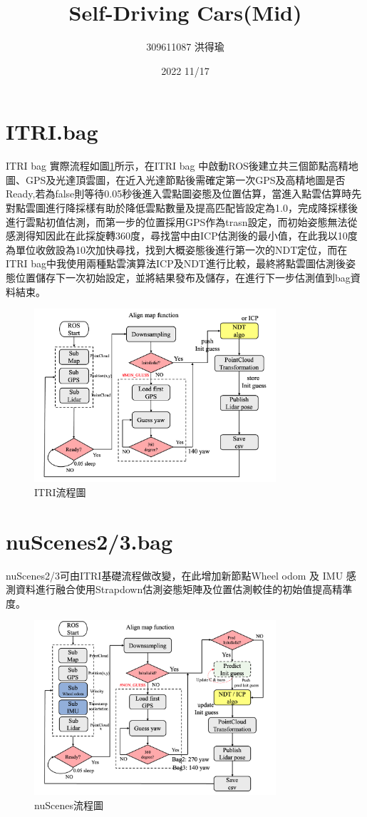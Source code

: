 \documentclass{article}
\title{Self-Driving Cars(Mid)}
\author{309611087 洪得瑜}
\date{2022 11/17}
\begin{document}
\maketitle
\section{ITRI.bag}
ITRI bag 實際流程如圖\ref{fig:itri.png}所示，在ITRI bag 中啟動ROS後建立共三個節點高精地圖、GPS及光達頂雲圖，在近入光達節點後需確定第一次GPS及高精地圖是否Ready,若為false則等待0.05秒後進入雲點圖姿態及位置估算，當進入點雲估算時先對點雲圖進行降採樣有助於降低雲點數量及提高匹配皆設定為1.0，完成降採樣後進行雲點初值估測，而第一步的位置採用GPS作為trasn設定，而初始姿態無法從感測得知因此在此採旋轉360度，尋找當中由ICP估測後的最小值，在此我以10度為單位收斂設為10次加快尋找，找到大概姿態後進行第一次的NDT定位，而在ITRI bag中我使用兩種點雲演算法ICP及NDT進行比較，最終將點雲圖估測後姿態位置儲存下一次初始設定，並將結果發布及儲存，在進行下一步估測值到bag資料結束。
\begin{figure}[H]
\centering
	\includegraphics[width=0.8\textwidth]{./ITRI_flow.png}
	\caption{ITRI流程圖}
	\label{fig:itri.png}
\end{figure}


\section{nuScenes2/3.bag}
nuScenes2/3可由ITRI基礎流程做改變，在此增加新節點Wheel odom 及 IMU 感測資料進行融合使用Strapdown估測姿態矩陣及位置估測較佳的初始值提高精準度。
\begin{figure}[H]
\centering
	\includegraphics[width=0.8\textwidth]{./nuscenes.png}
	\caption{nuScenes流程圖}
	\label{fig:.png}
\end{figure}
\end{document}
